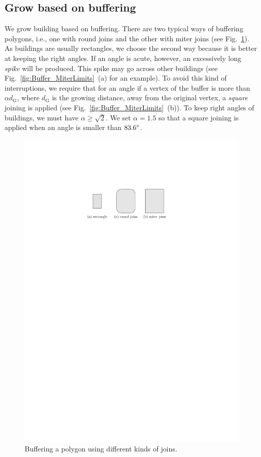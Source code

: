 \documentclass[graybox]{svmult}
\newcommand{\fig}{Fig.~}
\begin{document}
\subsection{Grow based on buffering}
\label{sec:Grow}
We grow building based on buffering. 
There are two typical ways of buffering polygons, i.e.,
one with round joins and the other with miter joins (see 
\fig\ref{fig:Buffer_TwoKinds}).
As buildings are usually rectangles, 
we choose the second way because it is 
better at keeping the right angles.
If an angle is acute, however, an excessively long \emph{spike} will be 
produced.
This spike may go across other buildings 
(see \fig\ref{fig:Buffer_MiterLimits}~(a) for an example).
To avoid this kind of interruptions, 
we require that for an angle if a vertex of the 
buffer is more than $\alpha d_\mathrm{G}$, where $d_\mathrm{G}$ is the growing 
distance, away 
from the original vertex, 
a \emph{square} joining is applied
(see \fig\ref{fig:Buffer_MiterLimits}~(b)).
To keep right angles of buildings, 
we must have $\alpha \geq \sqrt{2}$. 
We set $\alpha  = 1.5$ so that a square joining is applied when an angle is 
smaller than $83.6 \degree$.

\begin{figure}[tb]
	\centering
	\includegraphics{Buffer_TwoKinds}
	\caption{Buffering a polygon using different kinds of joins.}
	\label{fig:Buffer_TwoKinds}
\end{figure}
\end{document}
